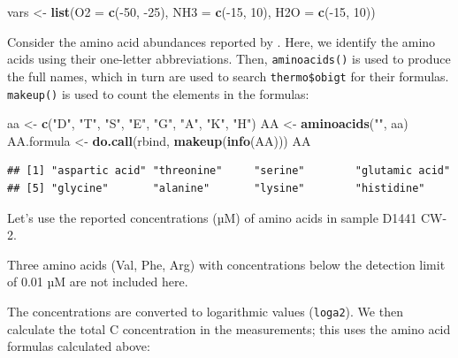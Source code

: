 \documentclass[]{tufte-book}
\newenvironment{Shaded}{}{}
\newcommand{\KeywordTok}[1]{\textcolor[rgb]{0.00,0.44,0.13}{\textbf{#1}}}
\newcommand{\DataTypeTok}[1]{\textcolor[rgb]{0.56,0.13,0.00}{#1}}
\newcommand{\DecValTok}[1]{\textcolor[rgb]{0.25,0.63,0.44}{#1}}
\newcommand{\StringTok}[1]{\textcolor[rgb]{0.25,0.44,0.63}{#1}}
\newcommand{\OperatorTok}[1]{\textcolor[rgb]{0.40,0.40,0.40}{#1}}
\newcommand{\NormalTok}[1]{#1}
\begin{document}
\begin{Shaded}
\begin{Highlighting}[]
\NormalTok{vars <-}\StringTok{ }\KeywordTok{list}\NormalTok{(}\DataTypeTok{O2 =} \KeywordTok{c}\NormalTok{(}\OperatorTok{-}\DecValTok{50}\NormalTok{, }\OperatorTok{-}\DecValTok{25}\NormalTok{), }\DataTypeTok{NH3 =} \KeywordTok{c}\NormalTok{(}\OperatorTok{-}\DecValTok{15}\NormalTok{, }\DecValTok{10}\NormalTok{), }\DataTypeTok{H2O =} \KeywordTok{c}\NormalTok{(}\OperatorTok{-}\DecValTok{15}\NormalTok{, }\DecValTok{10}\NormalTok{))}
\end{Highlighting}
\end{Shaded}

Consider the amino acid abundances reported by \citet{FMM_14}. Here, we
identify the amino acids using their one-letter abbreviations. Then,
{\texttt{aminoacids()}} is used to produce the full names, which in turn
are used to search \texttt{thermo\$obigt} for their formulas.
{\texttt{makeup()}} is used to count the elements in the formulas:

\begin{Shaded}
\begin{Highlighting}[]
\NormalTok{aa <-}\StringTok{ }\KeywordTok{c}\NormalTok{(}\StringTok{"D"}\NormalTok{, }\StringTok{"T"}\NormalTok{, }\StringTok{"S"}\NormalTok{, }\StringTok{"E"}\NormalTok{, }\StringTok{"G"}\NormalTok{, }\StringTok{"A"}\NormalTok{, }\StringTok{"K"}\NormalTok{, }\StringTok{"H"}\NormalTok{)}
\NormalTok{AA <-}\StringTok{ }\KeywordTok{aminoacids}\NormalTok{(}\StringTok{""}\NormalTok{, aa)}
\NormalTok{AA.formula <-}\StringTok{ }\KeywordTok{do.call}\NormalTok{(rbind, }\KeywordTok{makeup}\NormalTok{(}\KeywordTok{info}\NormalTok{(AA)))}
\NormalTok{AA}
\end{Highlighting}
\end{Shaded}

\begin{verbatim}
## [1] "aspartic acid" "threonine"     "serine"        "glutamic acid"
## [5] "glycine"       "alanine"       "lysine"        "histidine"
\end{verbatim}

Let's use the reported concentrations (µM) of amino acids in sample
D1441 CW-2.

\begin{marginfigure}
Three amino acids (Val, Phe, Arg) with concentrations below the
detection limit of 0.01 µM are not included here.
\end{marginfigure}

The concentrations are converted to logarithmic values (\texttt{loga2}).
We then calculate the total C concentration in the measurements; this
uses the amino acid formulas calculated above:
\end{document}
